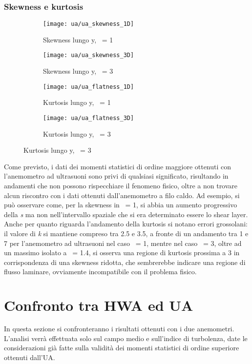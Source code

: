 \documentclass{article} %
\newcommand{\xd}{\nicefrac{\textrm{x}}{\textrm{D}}\ }
\newcommand{\yd}{\nicefrac{\textrm{y}}{\textrm{D}}\ }
\begin{document}
\subsubsection{Skewness e kurtosis}
\begin{figure}[ht!]
	\begin{subfigure}{0.5\textwidth}
		\texttt{[image: ua/ua\_skewness\_1D]}
		\caption{Skewness lungo y, \xd = 1}
		\label{ua_skewness_1D}
	\end{subfigure}
	\begin{subfigure}{0.5\textwidth}
		\texttt{[image: ua/ua\_skewness\_3D]}
		\caption{Skewness lungo y, \xd = 3}
		\label{ua_skewness_3D}
	\end{subfigure}
	\begin{subfigure}{0.5\textwidth}
		\texttt{[image: ua/ua\_flatness\_1D]}
		\caption{Kurtosis lungo y, \xd = 1}
		\label{ua_kurtosis_1D}
	\end{subfigure}
	\begin{subfigure}{0.5\textwidth}
		\texttt{[image: ua/ua\_flatness\_3D]}
		\caption{Kurtosis lungo y, \xd = 3}
		\label{ua_kurtosis_3D}
	\end{subfigure}
\end{figure}
Come previsto, i dati dei momenti statistici di ordine maggiore ottenuti con l'anemometro ad ultrasuoni sono privi di qualsiasi significato, risultando in andamenti che non possono rispecchiare il fenomeno fisico, oltre a non trovare alcun riscontro con i dati ottenuti dall'anemometro a filo caldo. Ad esempio, si può osservare come, per la skewness in \xd = 1, si abbia un aumento progressivo della \textit{s} ma non nell'intervallo spaziale che si era determinato essere lo shear layer. Anche per quanto riguarda l'andamento della kurtosis si notano errori grossolani: il valore di \textit{k} si mantiene compreso tra 2.5 e 3.5, a fronte di un andamento tra 1 e 7 per l'anemometro ad ultrasuoni nel caso \xd = 1, mentre nel caso \xd = 3, oltre ad un massimo isolato a \yd = 1.4, si osserva una regione di kurtosis prossima a 3 in corrispondenza di una skewness ridotta, che sembrerebbe indicare una regione di flusso laminare, ovviamente incompatibile con il problema fisico. 
\newpage
\section{Confronto tra HWA ed UA}
In questa sezione si confronteranno i risultati ottenuti con i due anemometri. L'analisi verrà effettuata solo sul campo medio e sull'indice di turbolenza, date le considerazioni già fatte sulla validità dei momenti statistici di ordine superiore ottenuti dall'UA.
\end{document}
